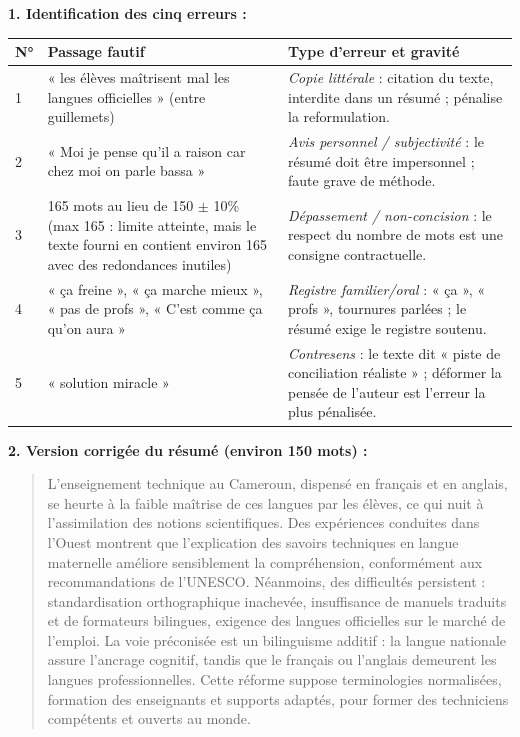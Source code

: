 \documentclass[11pt]{article}
\begin{document}
\begin{corrige}
\textbf{1. Identification des cinq erreurs :}

\begin{center}
\begin{tabularx}{\linewidth}{|l|X|X|}\hline
\rowcolor{popblueL} \textbf{N°} & \textbf{Passage fautif} & \textbf{Type d'erreur et gravité} \\ \hline
1 & « les élèves maîtrisent mal les langues officielles » (entre guillemets) & \emph{Copie littérale} : citation du texte, interdite dans un résumé ; pénalise la reformulation. \\ \hline
2 & « Moi je pense qu'il a raison car chez moi on parle bassa » & \emph{Avis personnel / subjectivité} : le résumé doit être impersonnel ; faute grave de méthode. \\ \hline
3 & 165 mots au lieu de 150 $\pm$ 10\% (max 165 : limite atteinte, mais le texte fourni en contient environ 165 avec des redondances inutiles) & \emph{Dépassement / non-concision} : le respect du nombre de mots est une consigne contractuelle. \\ \hline
4 & « ça freine », « ça marche mieux », « pas de profs », « C'est comme ça qu'on aura » & \emph{Registre familier/oral} : « ça », « profs », tournures parlées ; le résumé exige le registre soutenu. \\ \hline
5 & « solution miracle » & \emph{Contresens} : le texte dit « piste de conciliation réaliste » ; déformer la pensée de l'auteur est l'erreur la plus pénalisée. \\ \hline
\end{tabularx}
\end{center}

\textbf{2. Version corrigée du résumé (environ 150 mots) :}

\begin{quote}
L'enseignement technique au Cameroun, dispensé en français et en anglais, se heurte à la faible maîtrise de ces langues par les élèves, ce qui nuit à l'assimilation des notions scientifiques. Des expériences conduites dans l'Ouest montrent que l'explication des savoirs techniques en langue maternelle améliore sensiblement la compréhension, conformément aux recommandations de l'UNESCO. Néanmoins, des difficultés persistent : standardisation orthographique inachevée, insuffisance de manuels traduits et de formateurs bilingues, exigence des langues officielles sur le marché de l'emploi. La voie préconisée est un bilinguisme additif : la langue nationale assure l'ancrage cognitif, tandis que le français ou l'anglais demeurent les langues professionnelles. Cette réforme suppose terminologies normalisées, formation des enseignants et supports adaptés, pour former des techniciens compétents et ouverts au monde.
\end{quote}


\end{corrige}
\end{document}
